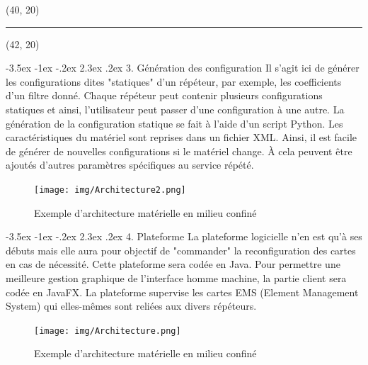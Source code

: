 \documentclass{beamer}
\makeatletter
\renewcommand{\section}{\@startsection {section}{1}{\z@}%
                                   {-3.5ex \@plus -1ex \@minus -.2ex}%
                                   {2.3ex \@plus.2ex}%
                                   {\normalfont\Large\bfseries}}
\makeatother
\begin{document}
\begin{textblock}{2}(40, 20)
	\begin{minipage}{0.99\textwidth}
	\begin{center}
	\rule{5pt}{84cm}	
	\end{center}
	\end{minipage}
\end{textblock}
\begin{textblock}{36}(42, 20)
	\begin{minipage}{0.99\textwidth}
	
	\section{3. Génération des configuration}
		Il s'agit ici de générer les configurations dites "statiques" d'un répéteur, par exemple, les coefficients d'un filtre donné. Chaque répéteur peut contenir plusieurs configurations statiques et ainsi, l'utilisateur peut passer d'une configuration à une autre.
		La génération de la configuration statique se fait à l'aide d'un script Python. Les caractéristiques du matériel sont reprises dans un fichier XML. Ainsi, il est facile de générer de nouvelles configurations si le matériel change. À cela peuvent être ajoutés d'autres paramètres spécifiques au service répété.
		\begin{figure}[!ht]
		\centering
		\texttt{[image: img/Architecture2.png]}
		\caption{Exemple d'architecture matérielle en milieu confiné}
		\end{figure}
	
	
	\section{4. Plateforme}
		La plateforme logicielle n'en est qu'à ses débuts mais elle aura pour objectif de "commander" la reconfiguration des cartes en cas de nécessité. Cette plateforme sera codée en Java. Pour permettre une meilleure gestion graphique de l'interface homme machine, la partie client sera codée en JavaFX. La plateforme supervise les cartes EMS (Element Management System) qui elles-mêmes sont reliées aux divers répéteurs.
		\begin{figure}[!ht]
		\centering
		\texttt{[image: img/Architecture.png]}
		\caption{Exemple d'architecture matérielle en milieu confiné}
		\end{figure}
	\end{minipage}
\end{textblock}
\end{document}
